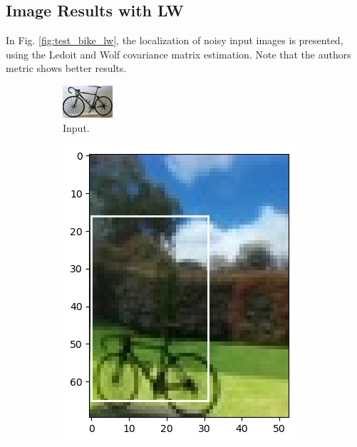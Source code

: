 \documentclass[11pt]{article}
\theoremstyle{definition}
\theoremstyle{remark}
\theoremstyle{remark}
\theoremstyle{remark}
\begin{document}
\subsection{Image Results with LW}
In Fig. \ref{fig:test_bike_lw}, the localization of noisy input images is presented, using the Ledoit and Wolf covariance matrix estimation. Note that the authors metric shows better results.
\begin{figure}[H]
  \centering
  \begin{subfigure}[b]{0.32\textwidth}
    \centering
    \includegraphics[width=\textwidth]{figs/input4.jpg}
    \caption{Input.}
  \end{subfigure}
  \begin{subfigure}[b]{0.32\textwidth}
    \centering
    \includegraphics[width=\textwidth]{figs/0-4-0-test_case1.jpg}

\end{subfigure}
\end{figure}
\end{document}
